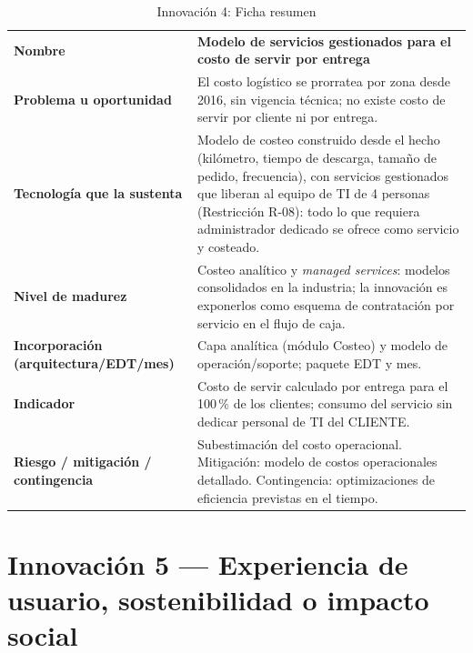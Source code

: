 \begin{table}[htbp]
\centering
\small
\caption{Innovación 4: Ficha resumen}
\label{tab:inn4}
\begin{tabularx}{\textwidth}{@{}L{5.2cm}X@{}}
\toprule
\textbf{Nombre} &
\textbf{Modelo de servicios gestionados para el costo de servir por entrega} \\
\addlinespace
\textbf{Problema u oportunidad} &
El costo logístico se prorratea por zona desde 2016, sin vigencia técnica; no existe costo
de servir por cliente ni por entrega. \\
\addlinespace
\textbf{Tecnología que la sustenta} &
Modelo de costeo construido desde el hecho (kilómetro, tiempo de descarga, tamaño de
pedido, frecuencia), con servicios gestionados que liberan al equipo de TI de 4 personas
(Restricción R-08): todo lo que requiera administrador dedicado se ofrece como servicio
y costeado. \\
\addlinespace
\textbf{Nivel de madurez} &
Costeo analítico y \emph{managed services}: modelos consolidados en la industria; la
innovación es exponerlos como esquema de contratación por servicio en el flujo de caja. \\
\addlinespace
\textbf{Incorporación (arquitectura/EDT/mes)} &
Capa analítica (módulo Costeo) y modelo de operación/soporte; \pendiente{} paquete EDT y
mes. \\
\addlinespace
\textbf{Indicador} &
Costo de servir calculado por entrega para el 100\,\% de los clientes; consumo del
servicio sin dedicar personal de TI del CLIENTE. \\
\addlinespace
\textbf{Riesgo / mitigación / contingencia} &
Subestimación del costo operacional. Mitigación: modelo de costos operacionales
detallado. Contingencia: optimizaciones de eficiencia previstas en el tiempo. \\
\bottomrule
\end{tabularx}
\end{table}

\section{Innovación 5 — Experiencia de usuario, sostenibilidad o impacto social}

